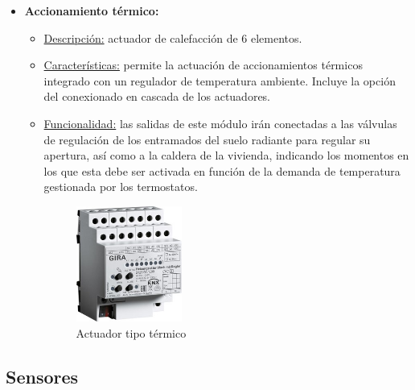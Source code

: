 \begin{itemize}
\item \textbf{Accionamiento térmico:} 
	\begin{itemize}
	\item\underline{Descripción:} actuador de calefacción de 6 elementos.
	\item \underline{Características:} permite la actuación de accionamientos térmicos integrado con un regulador de temperatura ambiente. Incluye la opción del conexionado en cascada de los actuadores.
	\item \underline{Funcionalidad:} las salidas de este módulo irán conectadas a las válvulas de regulación de los entramados del suelo radiante para regular su apertura, así como a la caldera de la vivienda, indicando los momentos en los que esta debe ser activada en función de la demanda de temperatura gestionada por los termostatos. \\ [0,15 cm]
	\begin{figure}[H]
	\centering
	\includegraphics[width=0.35\textwidth]{figures/actuador_termico.jpg}   
	\caption{Actuador tipo térmico}
	\label{fig:actuador_termico}
	\end{figure}
	\end{itemize} 
\end{itemize} 

\subsection{Sensores}

